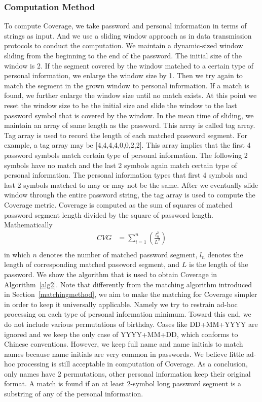 \subsubsection{Computation Method}
\label{computationmethod}
To compute Coverage, we take password and personal information in terms of strings as input. And we use a sliding window approach as in data transmission protocols to conduct the computation. We maintain a dynamic-sized window sliding from the beginning to the end of the password. The initial size of the window is 2. If the segment covered by the window matched to a certain type of personal information, we enlarge the window size by 1. Then we try again to match the segment in the grown window to personal information. If a match is found, we further enlarge the window size until no match exists. At this point we reset the window size to be the initial size and slide the window to the last password symbol that is covered by the window.
In the mean time of sliding, we maintain an array of same length as the password. This array is called tag array. Tag array is used to record the length of each matched password segment. For example, a tag array may be [4,4,4,4,0,0,2,2]. This array implies that the first 4 password symbols match certain type of personal information. The following 2 symbols have no match and the last 2 symbols again match certain type of personal information. The personal information types that first 4 symbols and last 2 symbols matched to may or may not be the same. After we eventually slide window through the entire password string, the tag array is used to compute the Coverage metric. Coverage is computed as the sum of squares of matched password segment length divided by the square of password length. Mathematically
\begin{equation} \label{eq1}
\begin{split}
CVG & = \sum_{i=1}^n (\frac{l_n^2}{L^2}) \\
\end{split}
\end{equation}
in which $n$ denotes the number of matched password segment, $l_n$ denotes the length of corresponding matched password segment, and $L$ is the length of the password. We show the algorithm that is used to obtain Coverage in Algorithm~\ref{alg2}. Note that differently from the matching algorithm introduced in Section~\ref{matchingmethod}, we aim to make the matching for Coverage simpler in order to keep it universally applicable. Namely we try to restrain ad-hoc processing on each type of personal information minimum. Toward this end, we do not include various permutations of birthday. Cases like DD+MM+YYYY are ignored and we keep the only case of YYYY+MM+DD, which conforms to Chinese conventions. However, we keep full name and name initials to match names because name initials are very common in passwords. We believe little ad-hoc processing is still acceptable in computation of Coverage. As a conclusion, only names have 2 permutations, other personal information keep their original format. A match is found if an at least 2-symbol long password segment is a substring of any of the personal information.


